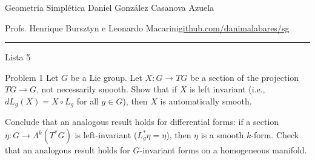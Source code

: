 
%



\begin{minipage}{\textwidth}
	\begin{minipage}{1\textwidth}
		Geometria Simpl\'etica \hfill Daniel González Casanova Azuela
		
		{\small Profs. Henrique Bursztyn e Leonardo Macarini\hfill\href{https://github.com/danimalabares/sg}{github.com/danimalabares/sg}}
	\end{minipage}
\end{minipage}\vspace{.2cm}\hrule

\vspace{10pt}
{\huge Lista 5}

\tableofcontents

\begin{idea1}{Problem 1}\leavevmode
	Let  $G$ be a Lie group. Let $X:G\longrightarrow TG$ be a section of the projection $TG\longrightarrow G$, not necessarily smooth. Show that if  $X$ is left invariant (i.e., $dL_g(X)=X\circ L_g$ for all $g\in G$), then $X$ is automatically smooth.

	Conclude that an analogous result holds for differential forms: if a section $\eta:G\to \Lambda^{k}(T^*G)$ is left-invariant ($L^*_g\eta=\eta$), then $\eta$ is a smooth $k$-form. Check that an analogous result holds for $G$-invariant forms on a homogeneous manifold.
\end{idea1}

